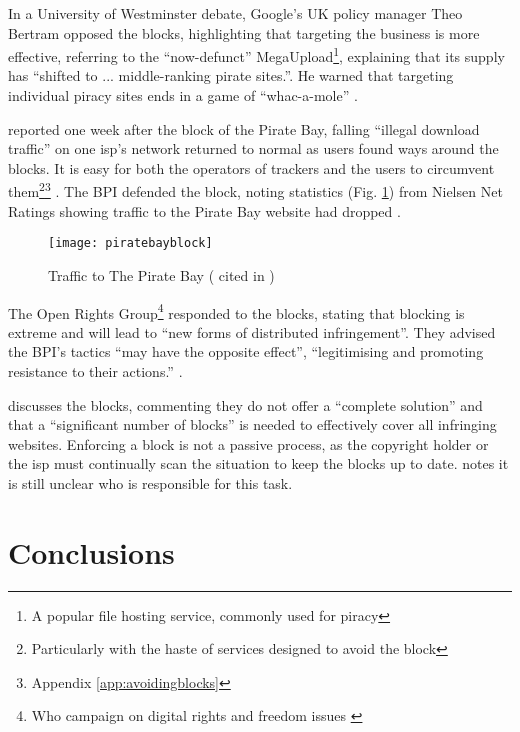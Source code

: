 In a University of Westminster debate, Google's UK policy manager Theo Bertram opposed the blocks, highlighting that targeting the business is more effective, referring to the ``now-defunct'' MegaUpload\footnote{A popular file hosting service, commonly used for piracy},  explaining that its supply has ``shifted to ... middle-ranking pirate sites.''. He warned that targeting individual piracy sites ends in a game of ``whac-a-mole'' \citep{torrentfreak2013google, musictank2013}.

\citet{bbc2012piratebay} reported one week after the block of the Pirate Bay, falling ``illegal download traffic'' on one \gls{isp}'s network returned to normal as users found ways around the blocks.
%
It is easy for both the operators of trackers and the users to circumvent them\footnote{Particularly with the haste of services designed to avoid the block}\footnote{Appendix \ref{app:avoidingblocks}} \citep{duah2013injunction, bbc2012piratebay, proxylist2014, comein2014}.
%
The BPI defended the block, noting statistics (Fig. \ref{fig:piratebayblock}) from Nielsen Net Ratings showing traffic to the Pirate Bay website had dropped \citep{bbc2012piratebay}.

\begin{figure}[h]
    \centering
    \texttt{[image: piratebayblock]}
    \caption{Traffic to The Pirate Bay (\citet{nielsen2012} cited in \citet{bbc2012piratebay})}
    \label{fig:piratebayblock}
\end{figure}

The Open Rights Group\footnote{Who campaign on digital rights and freedom issues \citep{org2014}} responded to the blocks, stating that blocking is extreme and will lead to ``new forms of distributed infringement''. They advised the BPI's tactics ``may have the opposite effect'', ``legitimising and promoting resistance to their actions.'' \citep{killock2013ORG}.

\citet{duah2013injunction} discusses the blocks, commenting they do not offer a ``complete solution'' and that a ``significant number of blocks'' is needed to effectively cover all infringing websites.
%
Enforcing a block is not a passive process, as the copyright holder or the \gls{isp} must continually scan the situation to keep the blocks up to date. \citet{duah2013injunction} notes it is still unclear who is responsible for this task.

\section{Conclusions}

